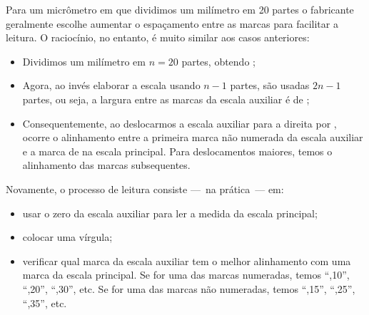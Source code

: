 \begin{marginfigure}[3cm]
\centering
{}
\caption{Escala auxiliar 1/20 mm.\label{Fig:Paquimetro20LeituraZero}}
\end{marginfigure}

Para um micrômetro em que dividimos um milímetro em 20 partes o fabricante geralmente escolhe aumentar o espaçamento entre as marcas para facilitar a leitura. O raciocínio, no entanto, é muito similar aos casos anteriores:
\begin{itemize}
	\item Dividimos um milímetro em $n = 20$ partes, obtendo ;
	\item Agora, ao invés elaborar a escala usando $n - 1$ partes, são usadas $2n - 1$ partes, ou seja, a largura entre as marcas da escala auxiliar é de ;
	\item Consequentemente, ao deslocarmos a escala auxiliar para a direita por , ocorre o alinhamento entre a primeira marca não numerada da escala auxiliar e a marca de  na escala principal. Para deslocamentos maiores, temos o alinhamento das marcas subsequentes.
\end{itemize}
%
Novamente, o processo de leitura consiste ---~na prática~--- em:
\begin{itemize}
	\item usar o zero da escala auxiliar para ler a medida da escala principal;
	\item colocar uma vírgula;
	\item verificar qual marca da escala auxiliar tem o melhor alinhamento com uma marca da escala principal. Se for uma das marcas numeradas, temos ``{,}10'', ``{,}20'', ``{,}30'', etc. Se for uma das marcas não numeradas, temos ``{,}15'', ``{,}25'', ``{,}35'', etc.
\end{itemize}

